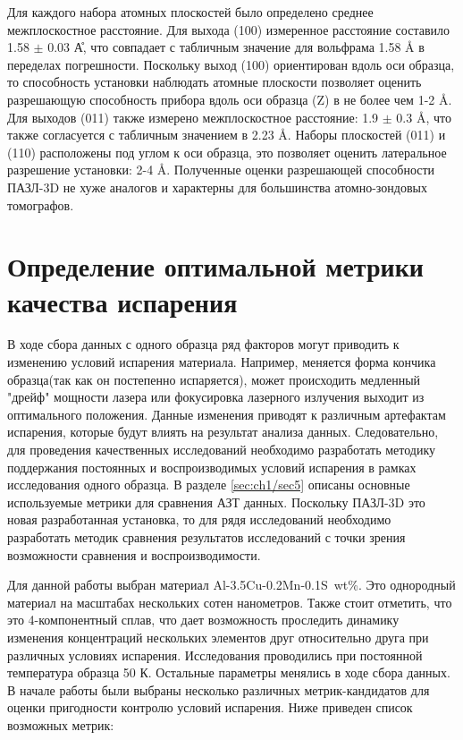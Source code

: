 Для каждого набора атомных плоскостей было определено среднее межплоскостное расстояние. Для выхода (100) измеренное расстояние составило 1.58 $\pm$ 0.03 \r{А}, что совпадает с табличным значение для вольфрама 1.58 \r{A} в переделах погрешности. Поскольку выход (100) ориентирован вдоль оси образца, то способность установки наблюдать атомные плоскости позволяет оценить разрешающую способность прибора вдоль оси образца (Z) в не более чем 1-2 \r{A}. Для выходов (011) также измерено межплоскостное расстояние: 1.9 $\pm$ 0.3 \r{A}, что также согласуется с табличным значением в 2.23 \r{A}. Наборы плоскостей (011) и (110) расположены под углом к оси образца, это позволяет оценить латеральное разрешение установки: 2-4 \r{A}. Полученные оценки разрешающей способности ПАЗЛ-3D не хуже аналогов и характерны для большинства атомно-зондовых томографов. 

\FloatBarrier

\section{Определение оптимальной метрики качества испарения}\label{sec:ch3/sect3}

В ходе сбора данных с одного образца ряд факторов могут приводить к изменению условий испарения материала. Например, меняется форма кончика образца(так как он постепенно испаряется), может происходить медленный "дрейф" мощности лазера или фокусировка лазерного излучения выходит из оптимального положения. Данные изменения приводят к различным артефактам испарения, которые будут влиять на результат анализа данных. Следовательно, для проведения качественных исследований необходимо разработать методику поддержания постоянных и воспроизводимых условий испарения в рамках исследования одного образца. В разделе \cref{sec:ch1/sec5} описаны основные используемые метрики для сравнения АЗТ данных. Поскольку ПАЗЛ-3D это новая разработанная установка, то для рядя исследований необходимо разработать методик сравнения результатов исследований с точки зрения возможности сравнения и воспроизводимости.

Для данной работы выбран материал Al-3.5Cu-0.2Mn-0.1S~wt\%. Это однородный материал на масштабах нескольких сотен нанометров. Также стоит отметить, что это 4-компонентный сплав, что дает возможность проследить динамику изменения концентраций нескольких элементов друг относительно друга при различных условиях испарения. Исследования проводились при постоянной температура образца 50 К. Остальные параметры менялись в ходе сбора данных. В начале работы были выбраны несколько различных метрик-кандидатов для оценки пригодности контролю условий испарения. Ниже приведен список возможных метрик:

